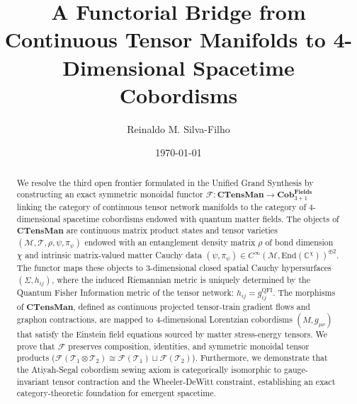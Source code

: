 \documentclass[11pt,a4paper,reqno]{amsart}
\theoremstyle{definition}
\numberwithin{equation}{section}
\newcommand{\CTens}{\mathbf{CTensMan}}
\newcommand{\Cob}{\mathbf{Cob}_{3+1}^{\mathbf{Fields}}}
\newcommand{\QFI}{\mathrm{QFI}}
\begin{document}
\title[A Functorial Bridge for Emergent Spacetime]{A Functorial Bridge from Continuous Tensor Manifolds to 4-Dimensional Spacetime Cobordisms}

\author{Reinaldo M. Silva-Filho}
\address{Universidade Federal de Lavras (UFLA), Departamento de Estat\'istica e Experimenta\c{c}\~ao Agropecu\'aria (PPGEEAA/DES)}

\date{\today}

\begin{abstract}
We resolve the third open frontier formulated in the Unified Grand Synthesis by constructing an exact symmetric monoidal functor $\mathcal{F}: \CTens \to \Cob$ linking the category of continuous tensor network manifolds to the category of 4-dimensional spacetime cobordisms endowed with quantum matter fields. The objects of $\CTens$ are continuous matrix product states and tensor varieties $(\mathcal{M}, \mathcal{T}, \rho, \psi, \pi_\psi)$ endowed with an entanglement density matrix $\rho$ of bond dimension $\chi$ and intrinsic matrix-valued matter Cauchy data $(\psi, \pi_\psi) \in C^\infty(\mathcal{M}, \mathrm{End}(\mathbb{C}^\chi))^{\oplus 2}$. The functor maps these objects to 3-dimensional closed spatial Cauchy hypersurfaces $(\Sigma, h_{ij})$, where the induced Riemannian metric is uniquely determined by the Quantum Fisher Information metric of the tensor network: $h_{ij} = g^{\QFI}_{ij}$. The morphisms of $\CTens$, defined as continuous projected tensor-train gradient flows and graphon contractions, are mapped to 4-dimensional Lorentzian cobordisms $(M, g_{\mu\nu})$ that satisfy the Einstein field equations sourced by matter stress-energy tensors. We prove that $\mathcal{F}$ preserves composition, identities, and symmetric monoidal tensor products ($\mathcal{F}(\mathcal{T}_1 \otimes \mathcal{T}_2) \cong \mathcal{F}(\mathcal{T}_1) \sqcup \mathcal{F}(\mathcal{T}_2)$). Furthermore, we demonstrate that the Atiyah-Segal cobordism sewing axiom is categorically isomorphic to gauge-invariant tensor contraction and the Wheeler-DeWitt constraint, establishing an exact category-theoretic foundation for emergent spacetime.
\end{abstract}

\maketitle

\tableofcontents

\end{document}
